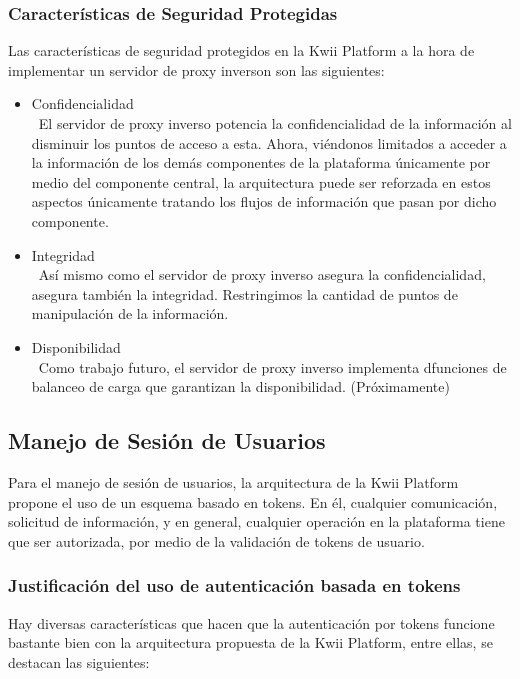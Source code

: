 \subsubsection{Características de Seguridad Protegidas}
Las características de seguridad protegidos en la Kwii Platform a la hora de implementar un servidor de proxy inverson son las siguientes:
\begin{itemize}
    \item Confidencialidad\\\
    El servidor de proxy inverso potencia la confidencialidad de la información al disminuir los puntos de acceso a esta. Ahora, viéndonos limitados a acceder a la información de los demás componentes de la plataforma únicamente por medio del componente central, la arquitectura puede ser reforzada en estos aspectos únicamente tratando los flujos de información que pasan por dicho componente.
    \item Integridad\\\
    Así mismo como el servidor de proxy inverso asegura la confidencialidad, asegura también la integridad. Restringimos la cantidad de puntos de manipulación de la información.
    \item Disponibilidad\\\
    Como trabajo futuro, el servidor de proxy inverso implementa dfunciones de balanceo de carga que garantizan la disponibilidad. (Próximamente)
\end{itemize}

\subsection{Manejo de Sesión de Usuarios}

Para el manejo de sesión de usuarios, la arquitectura de la Kwii Platform propone el uso de un esquema basado en tokens. En él, cualquier comunicación, solicitud de información, y en general, cualquier operación en la plataforma tiene que ser autorizada, por medio de la validación de tokens de usuario.

\subsubsection{Justificación del uso de autenticación basada en tokens}

Hay diversas características que hacen que la autenticación por tokens funcione bastante bien con la arquitectura propuesta de la Kwii Platform, entre ellas, se destacan las siguientes:

